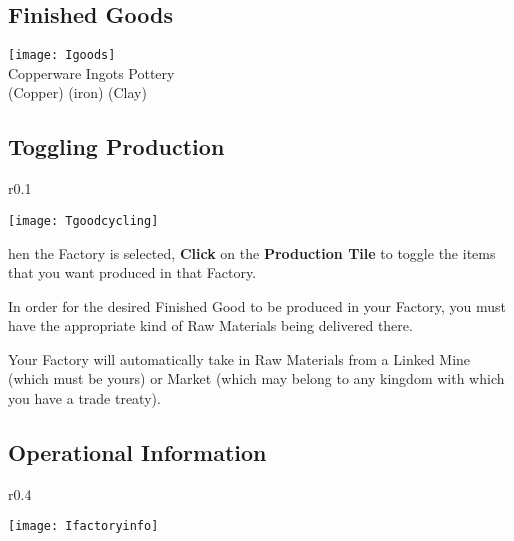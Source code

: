 \subsection{Finished Goods}


\begin{center}
	\texttt{[image: Igoods]} %
	\\ Copperware Ingots Pottery
	\\ (Copper) (iron) (Clay)
\end{center}

\subsection{Toggling Production}


\begin{wrapfigure}{r}{0.1\textwidth}
	\vspace{-20pt}
	\begin{center}
		\texttt{[image: Tgoodcycling]}
	\end{center}
	\vspace{-20pt}
\end{wrapfigure}


hen the Factory is selected, \textbf{Click} on the \textbf{Production Tile} to toggle the items that you want produced in that Factory.

In order for the desired Finished Good to be produced in your Factory, you must have the appropriate kind of Raw Materials being delivered there.

Your Factory will automatically take in Raw Materials from a Linked Mine (which must be yours) or Market (which may belong to any kingdom with which you have a trade treaty).

\clearpage

\subsection{Operational Information}


\begin{wrapfigure}{r}{0.4\textwidth}
	\vspace{-20pt}
	\begin{center}
		\texttt{[image: Ifactoryinfo]} %
	\end{center}
	\vspace{-20pt}
\end{wrapfigure}

